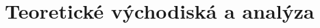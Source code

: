 \documentclass[../../thesis.tex]{subfiles}
\begin{document}
\section{Teoretické východiská a analýza}\label{sec:teoreticka-analyza}






\end{document}
